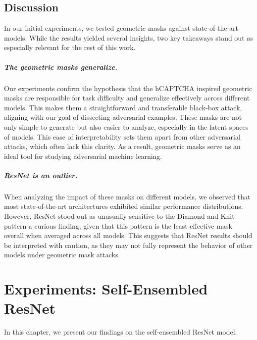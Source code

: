 \documentclass[a4paper, oneside]{discothesis}
\begin{document}
\section{Discussion}

In our initial experiments, we tested geometric masks against state-of-the-art models. While the results yielded several insights, two key takeaways stand out as especially relevant for the rest of this work.

\paragraph{The geometric masks generalize.}

Our experiments confirm the hypothesis that the hCAPTCHA inspired geometric masks are responsible for task difficulty and generalize effectively across different models. This makes them a straightforward and transferable black-box attack, aligning with our goal of dissecting adversarial examples. These masks are not only simple to generate but also easier to analyze, especially in the latent spaces of models. This ease of interpretability sets them apart from other adversarial attacks, which often lack this clarity. As a result, geometric masks serve as an ideal tool for studying adversarial machine learning.

\paragraph{ResNet is an outlier.}

When analyzing the impact of these masks on different models, we observed that most state-of-the-art architectures exhibited similar performance distributions. However, ResNet stood out as unusually sensitive to the Diamond and Knit pattern \textendash{} a curious finding, given that this pattern is the least effective mask overall when averaged across all models. This suggests that ResNet results should be interpreted with caution, as they may not fully represent the behavior of other models under geometric mask attacks.

% 
% 

\chapter{Experiments: Self-Ensembled ResNet}

In this chapter, we present our findings on the self-ensembled ResNet model.
\end{document}
